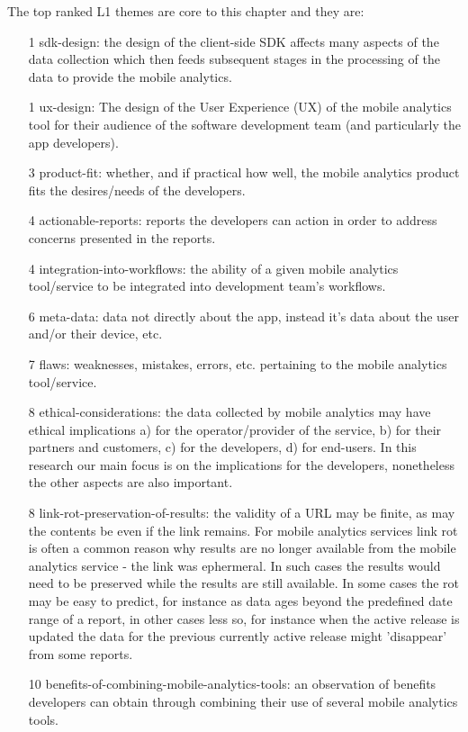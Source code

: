 The top ranked L1 themes are core to this chapter and they are: 
{\small
\begin{enumerate}
    \itemsep0em
    \item[1] sdk-design: the design of the client-side SDK affects many aspects of the data collection which then feeds subsequent stages in the processing of the data to provide the mobile analytics.
    \item[1] ux-design: The design of the User Experience (UX) of the mobile analytics tool for their audience of the software development team (and particularly the app developers).
    \item[3] product-fit: whether, and if practical how well, the mobile analytics product fits the desires/needs of the developers. 
    \item[4] actionable-reports: reports the developers can action in order to address concerns presented in the reports.    
    \item[4] integration-into-workflows: the ability of a given mobile analytics tool/service to be integrated into development team's workflows.
    \item[6] meta-data: data not directly about the app, instead it's data about the user and/or their device, etc.
    \item[7] flaws: weaknesses, mistakes, errors, etc. pertaining to the mobile analytics tool/service.
    \item[8] ethical-considerations: the data collected by mobile analytics may have ethical implications a) for the operator/provider of the service, b) for their partners and customers, c) for the developers, d) for end-users. In this research our main focus is on the implications for the developers, nonetheless the other aspects are also important.
    \item[8] link-rot-preservation-of-results: the validity of a URL may be finite, as may the contents be even if the link remains. For mobile analytics services link rot is often a common reason why results are no longer available from the mobile analytics service - the link was ephermeral. In such cases the results would need to be preserved while the results are still available. In some cases the rot may be easy to predict, for instance as data ages beyond the predefined date range of a report, in other cases less so, for instance when the active release is updated the data for the previous currently active release might 'disappear' from some reports.
    \item[10] benefits-of-combining-mobile-analytics-tools: an observation of benefits developers can obtain through combining their use of several mobile analytics tools.

\end{enumerate}}
